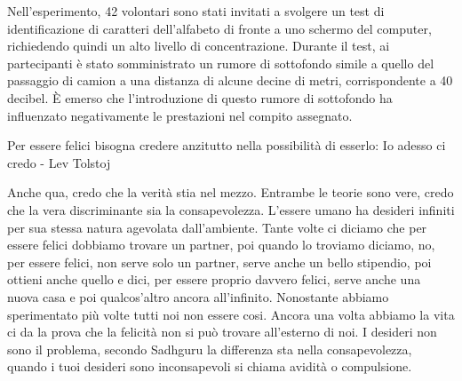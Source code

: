 \documentclass[12pt]{book} %
\begin{document}
\begin{mdframed}[linewidth=1pt]
Nell'esperimento, 42 volontari sono stati invitati a svolgere un test di identificazione di caratteri dell'alfabeto di fronte a uno schermo del computer, richiedendo quindi un alto livello di concentrazione. Durante il test, ai partecipanti è stato somministrato un rumore di sottofondo simile a quello del passaggio di camion a una distanza di alcune decine di metri, corrispondente a 40 decibel. È emerso che l'introduzione di questo rumore di sottofondo ha influenzato negativamente le prestazioni nel compito assegnato.
\end{mdframed}

Per essere felici bisogna credere anzitutto nella possibilità di esserlo: Io adesso ci credo - Lev Tolstoj 

Anche qua, credo che la verità stia nel mezzo. Entrambe le teorie sono vere, credo che la vera discriminante sia la
consapevolezza. L'essere umano ha desideri infiniti per sua stessa natura agevolata
dall'ambiente. Tante volte ci diciamo che per essere felici dobbiamo trovare un partner, poi
quando lo troviamo diciamo, no, per essere felici, non serve solo un partner, serve anche un bello stipendio, poi
ottieni anche quello e dici, per essere proprio davvero felici, serve anche una nuova casa e poi
qualcos'altro ancora all'infinito. Nonostante abbiamo sperimentato più
volte tutti noi non essere cosi. Ancora una volta abbiamo la vita ci da la prova che la felicità non si può trovare
all'esterno di noi. I desideri non sono il problema, secondo Sadhguru la differenza sta nella consapevolezza, quando i tuoi
desideri sono inconsapevoli si chiama avidità o compulsione. 
\end{document}
